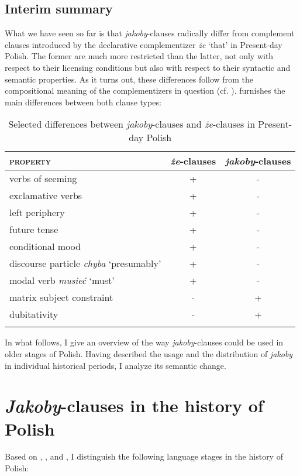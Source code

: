 \documentclass[output=paper
,modfonts
,nonflat]{langsci/langscibook}
\begin{document}
\subsection{Interim summary}

What we have seen so far is that \emph{jakoby}-clauses radically differ from complement clauses introduced by the declarative complementizer \emph{że} `that' in Present-day Polish. The former are much more restricted than the latter, not only with respect to their licensing conditions but also with respect to their syntactic and semantic properties. As it turns out, these differences follow from the compositional meaning of the complementizers in question (cf. \cite{Moulton2009}).  furnishes the main differences between both clause types: 

\begin{table}[h] 
\begin{tabular}{lcc} 
\lsptoprule
 \textsc{property} & \emph{że}-clauses & \emph{jakoby}-clauses \\
\midrule
verbs of seeming & + & - \\
exclamative verbs & + & - \\
left periphery & + & - \\
future tense & + & - \\
conditional mood & + & - \\
discourse particle \emph{chyba} `presumably' & + & - \\
modal verb \emph{musieć} `must' & + & - \\
matrix subject constraint & - & + \\
dubitativity & - & + \\  
\lspbottomrule
\end{tabular}
\caption{Selected differences between \emph{jakoby}-clauses and \emph{że}-clauses in Present-day Polish} \label{differences}
\end{table}

\noindent In what follows, I give an overview of the way \emph{jakoby}-clauses could be used in older stages of Polish. Having described the usage and the distribution of \emph{jakoby} in individual historical periods, I analyze its semantic change.  

\section{\emph{Jakoby}-clauses in the history of Polish} \label{diachrony} 

Based on \textcite{Klemensiewicz2009}, \textcite{Walczak1999}, and \textcite{Dziubalska-Koaczyk-Walczak2010}, I distinguish the following language stages in the history of Polish: 
\end{document}
